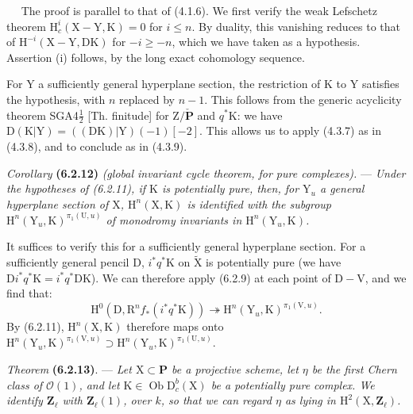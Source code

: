 \documentclass[11pt,leqno]{article}
\newcommand{\Page}[1]{\ifvmode\noindent\else\unskip\ \fi{\footnotesize\textcolor{gray}{[p.\,#1]}}\ \ignorespaces}
\begin{document}
\Page{250}
The proof is parallel to that of (4.1.6). We first verify the weak Lefschetz theorem \(\mathrm{H}_c^i(\mathrm{X}-\mathrm{Y},\mathrm{K})=0\) for \(i\leq n\). By duality, this vanishing reduces to that of \(\mathrm{H}^{-i}(\mathrm{X}-\mathrm{Y},\mathrm{DK})\) for \(-i\geq -n\), which we have taken as a hypothesis. Assertion (i) follows, by the long exact cohomology sequence.

For \(\mathrm{Y}\) a sufficiently general hyperplane section, the restriction of \(\mathrm{K}\) to \(\mathrm{Y}\) satisfies the hypothesis, with \(n\) replaced by \(n-1\). This follows from the generic acyclicity theorem SGA4\(\frac{1}{2}\) [Th. finitude] for \(\mathrm{Z}/\check{\mathbf{P}}\) and \(q^*\mathrm{K}\): we have \(\mathrm{D}(\mathrm{K}|\mathrm{Y})=((\mathrm{DK})|\mathrm{Y})(-1)[-2]\). This allows us to apply (4.3.7) as in (4.3.8), and to conclude as in (4.3.9).

\medskip
\textit{Corollary} \textbf{(6.2.12)} \textit{(global invariant cycle theorem, for pure complexes).} — \textit{Under the hypotheses of \textup{(6.2.11)}, if \(\mathrm{K}\) is potentially pure, then, for \(\mathrm{Y}_u\) a general hyperplane section of \(\mathrm{X}\), \(\mathrm{H}^n(\mathrm{X},\mathrm{K})\) is identified with the subgroup \(\mathrm{H}^n(\mathrm{Y}_u,\mathrm{K})^{\pi_1(\mathrm{U},u)}\) of monodromy invariants in \(\mathrm{H}^n(\mathrm{Y}_u,\mathrm{K})\).}

\medskip
It suffices to verify this for a sufficiently general hyperplane section. For a sufficiently general pencil \(\mathrm{D}\), \(i^*q^*\mathrm{K}\) on \(\widetilde{\mathrm{X}}\) is potentially pure (we have \(\mathrm{D}i^*q^*\mathrm{K}=i^*q^*\mathrm{DK}\)). We can therefore apply (6.2.9) at each point of \(\mathrm{D}-\mathrm{V}\), and we find that:
\[
\mathrm{H}^0(\mathrm{D},\mathrm{R}^nf_*(i^*q^*\mathrm{K}))
\twoheadrightarrow
\mathrm{H}^n(\mathrm{Y}_u,\mathrm{K})^{\pi_1(\mathrm{V},u)}.
\]
By (6.2.11), \(\mathrm{H}^n(\mathrm{X},\mathrm{K})\) therefore maps onto \(\mathrm{H}^n(\mathrm{Y}_u,\mathrm{K})^{\pi_1(\mathrm{V},u)}
\supset
\mathrm{H}^n(\mathrm{Y}_u,\mathrm{K})^{\pi_1(\mathrm{U},u)}\).

\medskip
\textit{Theorem} \textbf{(6.2.13)}. — \textit{Let \(\mathrm{X}\subset\mathbf{P}\) be a projective scheme, let \(\eta\) be the first Chern class of \(\mathcal{O}(1)\), and let \(\mathrm{K}\in\operatorname{Ob}\mathrm{D}_c^b(\mathrm{X})\) be a potentially pure complex. We identify \(\mathbf{Z}_{\ell}\) with \(\mathbf{Z}_{\ell}(1)\), over \(k\), so that we can regard \(\eta\) as lying in \(\mathrm{H}^2(\mathrm{X},\mathbf{Z}_{\ell})\).}
\end{document}
